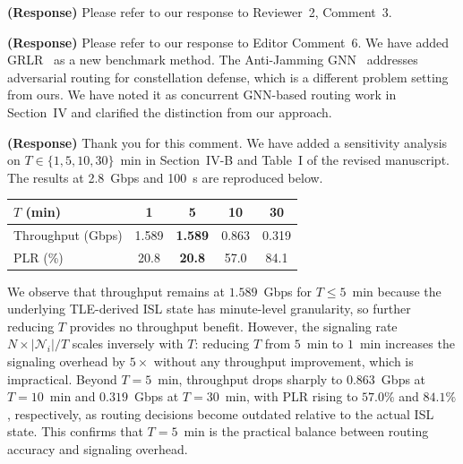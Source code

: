 \documentclass[letter]{article}
\begin{document}
\vspace{10mm}
\noindent {}

\vspace{5mm}
{\bf (Response)}
Please refer to our response to Reviewer~2, Comment~3.

\vspace{10mm}
\noindent {}

\vspace{5mm}
{\bf (Response)}
Please refer to our response to Editor Comment~6. We have added GRLR~\cite{zhang2025grlr} as a new benchmark method. The Anti-Jamming GNN~\cite{zhang2026anti} addresses adversarial routing for constellation defense, which is a different problem setting from ours. We have noted it as concurrent GNN-based routing work in Section~IV and clarified the distinction from our approach.

\vspace{10mm}
\noindent {}

\vspace{5mm}
{\bf (Response)}
Thank you for this comment. We have added a sensitivity analysis on $T \in \{1, 5, 10, 30\}$~min in Section~IV-B and Table~I of the revised manuscript. The results at 2.8~Gbps and 100~s are reproduced below.

\begin{center}
\begin{tabular}{lcccc}
\hline
$T$ (min)         & 1     & \textbf{5}     & 10    & 30    \\
\hline
Throughput (Gbps) & 1.589 & \textbf{1.589} & 0.863 & 0.319 \\
PLR (\%)          & 20.8  & \textbf{20.8}  & 57.0  & 84.1  \\
\hline
\end{tabular}
\end{center}

We observe that throughput remains at $1.589$~Gbps for $T \leq 5$~min because the underlying TLE-derived ISL state has minute-level granularity, so further reducing $T$ provides no throughput benefit. However, the signaling rate $N \times |\mathcal{N}_i|/T$ scales inversely with $T$: reducing $T$ from $5$~min to $1$~min increases the signaling overhead by $5\times$ without any throughput improvement, which is impractical. Beyond $T = 5$~min, throughput drops sharply to $0.863$~Gbps at $T = 10$~min and $0.319$~Gbps at $T = 30$~min, with PLR rising to $57.0\%$ and $84.1\%$, respectively, as routing decisions become outdated relative to the actual ISL state. This confirms that $T = 5$~min is the practical balance between routing accuracy and signaling overhead.
\end{document}

